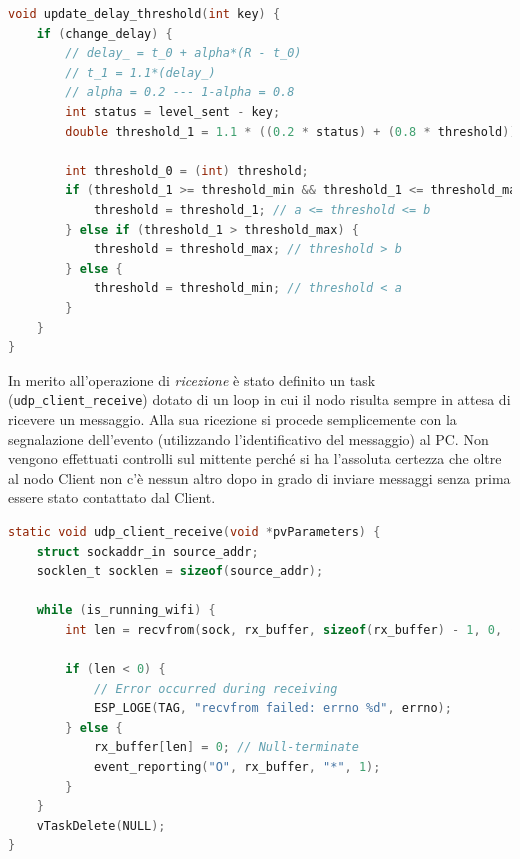 \begin{lstlisting}[language=C, caption= aggiornamento del valore di soglia]
void update_delay_threshold(int key) {
    if (change_delay) {
        // delay_ = t_0 + alpha*(R - t_0)
        // t_1 = 1.1*(delay_)
        // alpha = 0.2 --- 1-alpha = 0.8
        int status = level_sent - key;
        double threshold_1 = 1.1 * ((0.2 * status) + (0.8 * threshold));

        int threshold_0 = (int) threshold;
        if (threshold_1 >= threshold_min && threshold_1 <= threshold_max) {
            threshold = threshold_1; // a <= threshold <= b
        } else if (threshold_1 > threshold_max) {
            threshold = threshold_max; // threshold > b
        } else {
            threshold = threshold_min; // threshold < a
        }
    }
}
\end{lstlisting}

\noindent In merito all'operazione di \textit{ricezione} è stato definito un task (\texttt{udp\_client\_receive}) dotato di un loop in cui il nodo risulta sempre in attesa di ricevere un messaggio. Alla sua ricezione si procede semplicemente con la segnalazione dell'evento (utilizzando l'identificativo del messaggio) al PC. Non vengono effettuati controlli sul mittente perché si ha l'assoluta certezza che oltre al nodo Client non c'è nessun altro dopo in grado di inviare messaggi senza prima essere stato contattato dal Client.

\begin{lstlisting}[language=C, caption= metodo di ricezione Wi-Fi]
static void udp_client_receive(void *pvParameters) {
    struct sockaddr_in source_addr;
    socklen_t socklen = sizeof(source_addr);

    while (is_running_wifi) {
        int len = recvfrom(sock, rx_buffer, sizeof(rx_buffer) - 1, 0, (struct sockaddr *) &source_addr, &socklen);

        if (len < 0) { 
            // Error occurred during receiving
            ESP_LOGE(TAG, "recvfrom failed: errno %d", errno);
        } else {
            rx_buffer[len] = 0; // Null-terminate
            event_reporting("O", rx_buffer, "*", 1);
        }
    }
    vTaskDelete(NULL);
}
\end{lstlisting}

